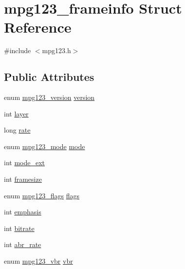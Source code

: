 \hypertarget{structmpg123__frameinfo}{}\section{mpg123\+\_\+frameinfo Struct Reference}
\label{structmpg123__frameinfo}


{\ttfamily \#include $<$mpg123.\+h$>$}

\subsection*{Public Attributes}
\begin{DoxyCompactItemize}
\item 
enum \hyperlink{group__mpg123__status_ga0553c78534d6d130df2d1dc0df675748}{mpg123\+\_\+version} \hyperlink{structmpg123__frameinfo_aa1276e21b0fd007148ac85b6290de057}{version}
\item 
int \hyperlink{structmpg123__frameinfo_a23b3cad377729431a601cff6dd227ee2}{layer}
\item 
long \hyperlink{structmpg123__frameinfo_ab0e716a76ae87991e4607e5803da6899}{rate}
\item 
enum \hyperlink{group__mpg123__status_ga044931724a9a987a86c2eea02f85cc4b}{mpg123\+\_\+mode} \hyperlink{structmpg123__frameinfo_a2d4adb8ca9bd6dc0de36c8dca3fe531d}{mode}
\item 
int \hyperlink{structmpg123__frameinfo_ad9c559387cf061d05384b4c204cd0e97}{mode\+\_\+ext}
\item 
int \hyperlink{structmpg123__frameinfo_a8846bf9e4d0f9246bf04a4d00254fce9}{framesize}
\item 
enum \hyperlink{group__mpg123__status_gaf527c5a99203cb8591b0e0dfb2615303}{mpg123\+\_\+flags} \hyperlink{structmpg123__frameinfo_a9cfdc10a11d1414d28e014f260756525}{flags}
\item 
int \hyperlink{structmpg123__frameinfo_a7b3a682d1c80446b4a01b9f6b6f8b470}{emphasis}
\item 
int \hyperlink{structmpg123__frameinfo_ac8bfd092c3c98ba1e97111709c036a4e}{bitrate}
\item 
int \hyperlink{structmpg123__frameinfo_aefb56c909ed7297d4b78aebdb478995a}{abr\+\_\+rate}
\item 
enum \hyperlink{group__mpg123__status_ga8253714e77705037271f377f33858876}{mpg123\+\_\+vbr} \hyperlink{structmpg123__frameinfo_a48708817882f58b0a32c1e9db6e9fd74}{vbr}
\end{DoxyCompactItemize}


